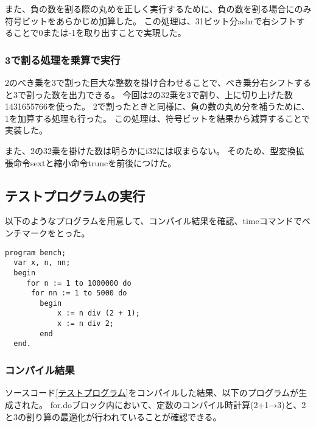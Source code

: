 また、負の数を割る際の丸めを正しく実行するために、負の数を割る場合にのみ符号ビットをあらかじめ加算した。
この処理は、31ビット分ashrで右シフトすることで0または-1を取り出すことで実現した。

\subsubsection{3で割る処理を乗算で実行}
2のべき乗を3で割った巨大な整数を掛け合わせることで、べき乗分右シフトすると3で割った数を出力できる。
今回は2の32乗を3で割り、上に切り上げた数1431655766を使った。
2で割ったときと同様に、負の数の丸め分を補うために、1を加算する処理も行った。
この処理は、符号ビットを結果から減算することで実装した。

また、2の32乗を掛けた数は明らかにi32には収まらない。
そのため、型変換拡張命令sextと縮小命令truncを前後につけた。

\subsection{テストプログラムの実行}
以下のようなプログラムを用意して、コンパイル結果を確認、timeコマンドでベンチマークをとった。
\begin{lstlisting}[caption={テストプログラム},label={テストプログラム}]
program bench;
  var x, n, nn;
  begin
     for n := 1 to 1000000 do
      for nn := 1 to 5000 do
        begin
            x := n div (2 + 1);
            x := n div 2;
        end
  end.
\end{lstlisting}

\subsubsection{コンパイル結果}
ソースコード\ref{テストプログラム}をコンパイルした結果、以下のプログラムが生成された。
for.doブロック内において、定数のコンパイル時計算(2+1→3)と、2と3の割り算の最適化が行われていることが確認できる。

